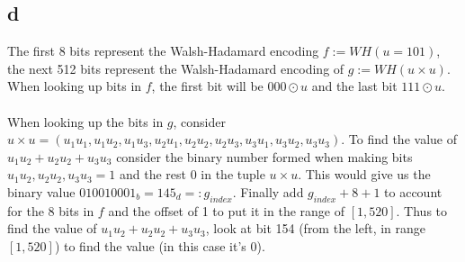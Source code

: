 \documentclass[letterpaper,notitlepage,twoside]{article}
\begin{document}
\subsection*{d}
The first 8 bits represent the Walsh-Hadamard encoding $f := WH(u=101)$, the next 512 bits represent the Walsh-Hadamard encoding of $g := WH(u \times u)$. When looking up bits in $f$, the first bit will be $000 \odot u$ and the last bit $111 \odot u$.
\\\\
When looking up the bits in $g$, consider $u \times u = \left( u_1u_1, u_1u_2, u_1u_3, u_2u_1, u_2u_2, u_2u_3, u_3u_1, u_3u_2, u_3u_3\right)$. To find the value of $u_1u_2 + u_2u_2 + u_3u_3$ consider the binary number formed when making bits $u_1u_2, u_2u_2, u_3u_3 = 1$ and the rest 0 in the tuple $u \times u$. This would give us the binary value $010010001_b = 145_d =: g_{index}$. Finally add $g_{index} + 8 + 1$ to account for the 8 bits in $f$ and the offset of 1 to put it in the range of $[1,520]$. Thus to find the value of $u_1u_2 + u_2u_2 + u_3u_3$, look at bit 154 (from the left, in range $[1,520]$) to find the value (in this case it's 0).
\end{document}

